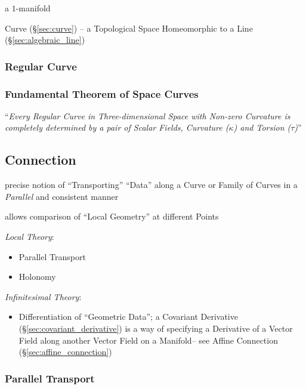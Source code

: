 a $1$-manifold

\fist Curve (\S\ref{sec:curve}) -- a Topological Space Homeomorphic to a Line
(\S\ref{sec:algebraic_line})



\subsubsection{Regular Curve}\label{sec:regular_curve}

\subsubsection{Fundamental Theorem of Space Curves}
\label{sec:fundamental_curve_theorem}

``\emph{Every Regular Curve in Three-dimensional Space with Non-zero
Curvature is completely determined by a pair of Scalar Fields, Curvature
($\kappa$) and Torsion ($\tau$)}''



\subsection{Connection}\label{sec:connection}

precise notion of ``Transporting'' ``Data'' along a Curve or Family of Curves
in a \emph{Parallel} and consistent manner

allows comparison of ``Local Geometry'' at different Points

\emph{Local Theory}:
\begin{itemize}
  \item Parallel Transport
  \item Holonomy
\end{itemize}

\emph{Infinitesimal Theory}:
\begin{itemize}
  \item Differentiation of ``Geometric Data''; a Covariant Derivative
    (\S\ref{sec:covariant_derivative}) is a way of specifying a Derivative of a
    Vector Field along another Vector Field on a Manifold-- see Affine
    Connection (\S\ref{sec:affine_connection})
\end{itemize}



\subsubsection{Parallel Transport}\label{sec:parallel_transport}

